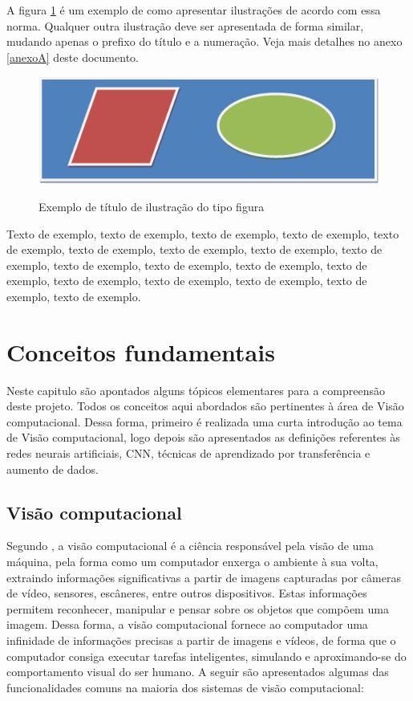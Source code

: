 \documentclass[
	12pt,				%
	oneside,			%
	a4paper,			%
	english,			%
	brazil				%
	]{abntex2ppgsi}
\begin{document}
A figura \ref{fig:figura-exemplo5} é um exemplo de como apresentar ilustrações de acordo com essa norma. Qualquer outra ilustração deve ser apresentada de forma similar, mudando apenas o prefixo do título e a numeração. Veja mais detalhes no anexo \ref{anexoA} deste documento.

\begin{figure}[htbp]
	\centering
	\caption{Exemplo de título de ilustração do tipo figura}
		\includegraphics{figura-exemplo.png}
	\label{fig:figura-exemplo5}
\end{figure}

Texto de exemplo, texto de exemplo, texto de exemplo, texto de exemplo, texto de exemplo, texto de exemplo, texto de exemplo, texto de exemplo, texto de exemplo, texto de exemplo, texto de exemplo, texto de exemplo, texto de exemplo, texto de exemplo, texto de exemplo, texto de exemplo, texto de exemplo, texto de exemplo.


\chapter{Conceitos fundamentais}

Neste capitulo são apontados alguns tópicos elementares para a compreensão deste projeto. Todos os conceitos aqui abordados são pertinentes à área de Visão computacional. Dessa forma, primeiro é realizada uma curta introdução ao tema de Visão computacional, logo depois são apresentados as definições referentes às redes neurais artificiais, CNN, técnicas de aprendizado por transferência e aumento de dados.

\section{Visão computacional}

Segundo , a visão computacional é a ciência responsável pela visão de uma máquina, pela forma como um computador enxerga o ambiente à sua volta, extraindo informações significativas a partir de imagens capturadas por câmeras de vídeo, sensores, escâneres, entre outros dispositivos. Estas informações permitem reconhecer, manipular e pensar sobre os objetos que compõem uma imagem. Dessa forma, a visão computacional fornece ao computador uma infinidade de informações precisas a partir de imagens e vídeos, de forma que o computador consiga executar tarefas inteligentes, simulando e aproximando-se do comportamento visual do ser humano. A seguir são apresentados algumas das funcionalidades comuns na maioria dos sistemas de visão computacional:
\end{document}
